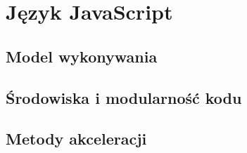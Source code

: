 \chapter{Język JavaScript}


\section{Model wykonywania}

\section{Środowiska i modularność kodu}
\label{sec:env-modules}


\section{Metody akceleracji}
\label{sec:acc-methods}

